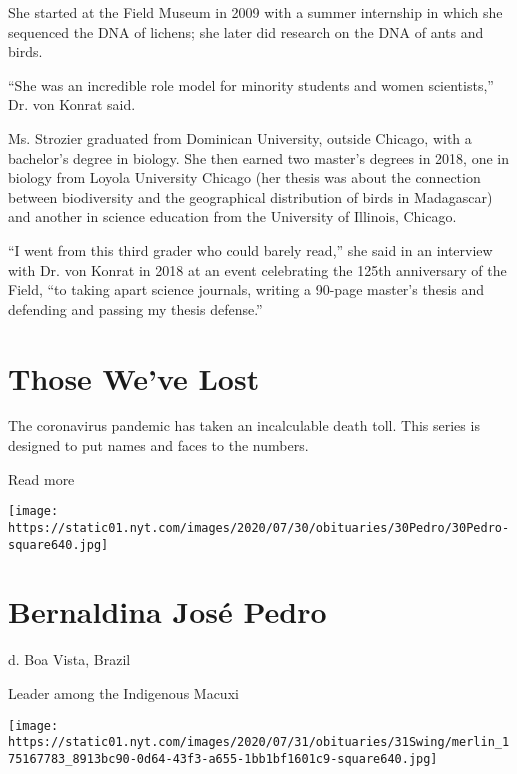 She started at the Field Museum in 2009 with a summer internship in
which she sequenced the DNA of lichens; she later did research on the
DNA of ants and birds.

``She was an incredible role model for minority students and women
scientists,'' Dr. von Konrat said.

Ms. Strozier graduated from Dominican University, outside Chicago, with
a bachelor's degree in biology. She then earned two master's degrees in
2018, one in biology from Loyola University Chicago (her thesis was
about the connection between biodiversity and the geographical
distribution of birds in Madagascar) and another in science education
from the University of Illinois, Chicago.

``I went from this third grader who could barely read,'' she said in an
interview with Dr. von Konrat in 2018 at an event celebrating the 125th
anniversary of the Field, ``to taking apart science journals, writing a
90-page master's thesis and defending and passing my thesis defense.''

\href{https://www.nytimes.com/interactive/2020/obituaries/people-died-coronavirus-obituaries.html?action=click\&pgtype=Article\&state=default\&region=BELOW_MAIN_CONTENT\&context=covid_obits_promo}{}

\hypertarget{those-weve-lost}{%
\section{Those We've Lost}\label{those-weve-lost}}

The coronavirus pandemic has taken an incalculable death toll. This
series is designed to put names and faces to the numbers.

Read more

\texttt{[image: https://static01.nyt.com/images/2020/07/30/obituaries/30Pedro/30Pedro-square640.jpg]}

\hypertarget{bernaldina-josuxe9-pedro}{%
\section{Bernaldina José Pedro}\label{bernaldina-josuxe9-pedro}}

d. Boa Vista, Brazil

Leader among the Indigenous Macuxi

\texttt{[image: https://static01.nyt.com/images/2020/07/31/obituaries/31Swing/merlin\_175167783\_8913bc90-0d64-43f3-a655-1bb1bf1601c9-square640.jpg]}


